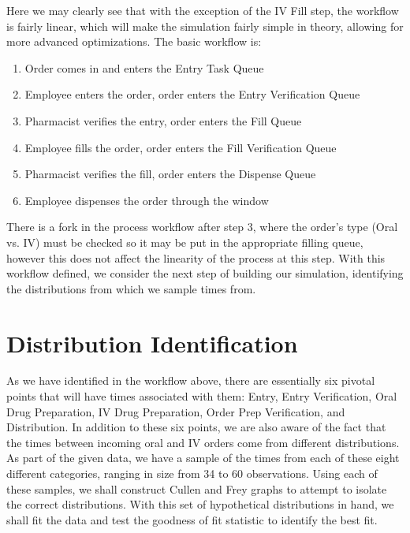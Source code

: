 \documentclass[10pt]{report}            %
\begin{document}
Here we may clearly see that with the exception of the IV Fill step, the workflow is fairly linear, which will make the simulation fairly simple in theory, allowing for more advanced optimizations. The basic workflow is:
\begin{enumerate}
\item Order comes in and enters the Entry Task Queue
\item Employee enters the order, order enters the Entry Verification Queue
\item Pharmacist verifies the entry, order enters the Fill Queue
\item Employee fills the order, order enters the Fill Verification Queue
\item Pharmacist verifies the fill, order enters the Dispense Queue
\item Employee dispenses the order through the window
\end{enumerate}
There is a fork in the process workflow after step 3, where the order's type (Oral vs. IV) must be checked so it may be put in the appropriate filling queue, however this does not affect the linearity of the process at this step. With this workflow defined, we consider the next step of building our simulation, identifying the distributions from which we sample times from.
\section*{Distribution Identification}
As we have identified in the workflow above, there are essentially six pivotal points that will have times associated with them: Entry, Entry Verification, Oral Drug Preparation, IV Drug Preparation, Order Prep Verification, and Distribution. In addition to these six points, we are also aware of the fact that the times between incoming oral and IV orders come from different distributions. As part of the given data, we have a sample of the times from each of these eight different categories, ranging in size from 34 to 60 observations. Using each of these samples, we shall construct Cullen and Frey graphs to attempt to isolate the correct distributions. With this set of hypothetical distributions in hand, we shall fit the data and test the goodness of fit statistic to identify the best fit.
\end{document}

